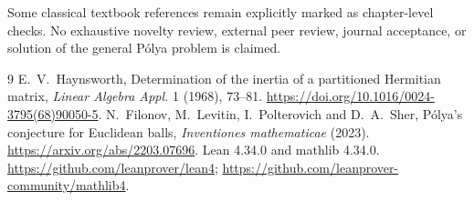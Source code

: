 \documentclass[11pt]{article}
\begin{document}
Some classical textbook references remain explicitly marked as chapter-level checks. No exhaustive novelty review, external peer review, journal acceptance, or solution of the general P\'olya problem is claimed.
\begin{thebibliography}{9}
 E.~V.~Haynsworth, Determination of the inertia of a partitioned Hermitian matrix, \emph{Linear Algebra Appl.} 1 (1968), 73--81. \url{https://doi.org/10.1016/0024-3795(68)90050-5}.
 N.~Filonov, M.~Levitin, I.~Polterovich and D.~A.~Sher, P\'olya's conjecture for Euclidean balls, \emph{Inventiones mathematicae} (2023). \url{https://arxiv.org/abs/2203.07696}.
 Lean 4.34.0 and mathlib 4.34.0. \url{https://github.com/leanprover/lean4}; \url{https://github.com/leanprover-community/mathlib4}.
\end{thebibliography}
\end{document}
